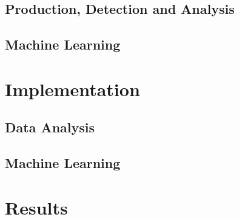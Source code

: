 \documentclass[14pt, a4paper]{book}
\begin{document}
\chapter{Production, Detection and Analysis}



\chapter{Machine Learning}


\part{Implementation}
\chapter{Data Analysis}


\chapter{Machine Learning}


\part{Results}

\graphicspath{{figures/}}
\end{document}
